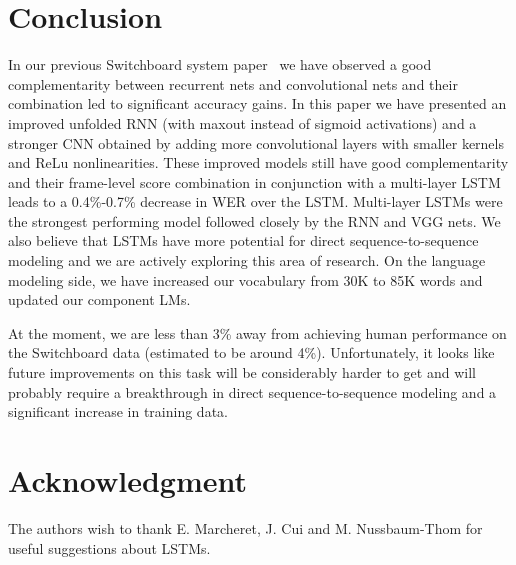 \documentclass[a4paper]{article}
\begin{document}
 \section{Conclusion}
\label{conclusion}
In our previous Switchboard system paper~\cite{saon15} we have
observed a good complementarity between recurrent nets and
convolutional nets and their combination led to significant accuracy
gains. In this paper we have presented an improved unfolded RNN (with
maxout instead of sigmoid activations) and a stronger CNN obtained by
adding more convolutional layers with smaller kernels and ReLu
nonlinearities. These improved models still have good complementarity
and their frame-level score combination in conjunction with a
multi-layer LSTM leads to a 0.4\%-0.7\% decrease in WER over the LSTM.
Multi-layer LSTMs were the strongest performing model followed closely
by the RNN and VGG nets. We also believe that LSTMs have more
potential for direct sequence-to-sequence modeling and we are actively
exploring this area of research. On the language modeling side, we
have increased our vocabulary from 30K to 85K words and updated our
component LMs.

At the moment, we are less than 3\% away from achieving human performance
on the Switchboard data (estimated to be around 4\%). Unfortunately,
it looks like future improvements on this task will be considerably
harder to get and will probably require a breakthrough in direct
sequence-to-sequence modeling and a significant increase in training
data.
\section{Acknowledgment} 
The authors wish to thank E. Marcheret, J. Cui and M. Nussbaum-Thom for useful suggestions about LSTMs.



\end{document}
